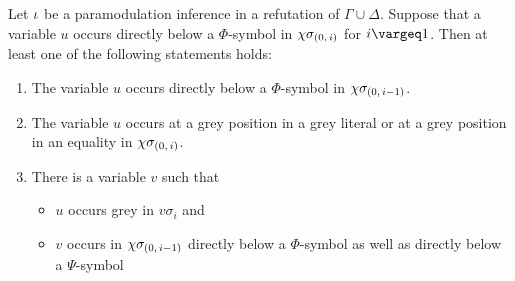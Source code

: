 \documentclass[,%
	draft=false,%
	numbers=noendperiod
	12pt,
	a4paper,
	oneside,%
	openany,
]{memoir}
\newcommand{\inv}{\ensuremath{\chi}}
\begin{document}
\begin{lemma}
	\label{lemma:var_below_phi_symbol_paramod}
	Let $\iota$ be a paramodulation inference in a refutation of $\Gamma\cup\Delta$.
	Suppose that a variable $u$ occurs directly below a $\Phi$-symbol in $\inv\sigmazi$ for $i\vargeq 1$.
	Then at least one of the following statements holds:
	\begin{enumerate}
		\item
			\label{15_1}
			The variable $u$ occurs directly below a $\Phi$-symbol in $\inv\sigmazmi$.

		\item
			\label{15_5}
			The variable $u$ occurs at a grey position in a grey literal or at a grey position in an equality in $\inv\sigmazi$.

		\item 
			\label{15_2}
			There is a variable $v$ such that 
			{
				\renewcommand{\labelitemi}{\textendash}
				\begin{itemize}
					\item $u$ occurs grey in $v\sigma_i$ and
					\item $v$ occurs in $\inv\sigmazmi$ directly below a $\Phi$-symbol as well as directly below a $\Psi$-symbol
				\end{itemize}
			}


	\end{enumerate}
\end{lemma}
\cbstart
\end{document}
